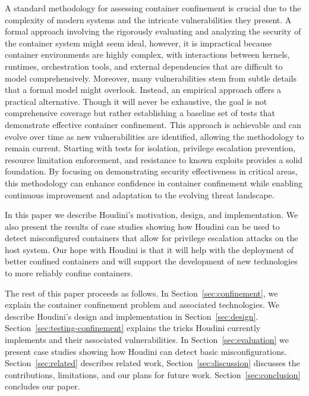 A standard methodology for assessing container confinement is crucial due to the complexity of modern systems and the intricate vulnerabilities they present. A formal approach involving the rigorously evaluating and analyzing the security of the container system might seem ideal, however, it is impractical because container environments are highly complex, with interactions between kernels, runtimes, orchestration tools, and external dependencies that are difficult to model comprehensively. Moreover, many vulnerabilities stem from subtle details that a formal model might overlook. Instead, an empirical approach offers a practical alternative. Though it will never be exhaustive, the goal is not comprehensive coverage but rather establishing a baseline set of tests that demonstrate effective container confinement. This approach is achievable and can evolve over time as new vulnerabilities are identified, allowing the methodology to remain current. Starting with tests for isolation, privilege escalation prevention, resource limitation enforcement, and resistance to known exploits provides a solid foundation. By focusing on demonstrating security effectiveness in critical areas, this methodology can enhance confidence in container confinement while enabling continuous improvement and adaptation to the evolving threat landscape.

In this paper we describe Houdini's motivation, design, and implementation. We also present the results of case studies showing how Houdini can be used to detect misconfigured containers that allow for privilege escalation attacks on the host system. Our hope with Houdini is that it will help with the deployment of better confined containers and will support the development of new technologies to more reliably confine containers.

The rest of this paper proceeds as follows. In Section~\ref{sec:confinement}, we explain the container confinement problem and associated technologies.  We describe Houdini's design and implementation in Section~\ref{sec:design}. Section~\ref{sec:testing-confinement} explains the tricks Houdini currently implements and their associated vulnerabilities.  In Section~\ref{sec:evaluation} we present case studies showing how Houdini can detect basic misconfigurations.  Section~\ref{sec:related} describes related work, Section~\ref{sec:discussion} discusses the contributions, limitations, and our plans for future work.  Section~\ref{sec:conclusion} concludes our paper.



